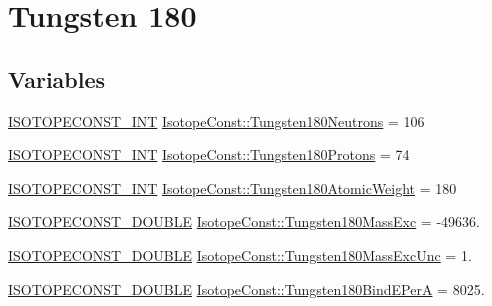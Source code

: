 \hypertarget{group___isotope_const-_tungsten-_w180}{}\section{Tungsten 180}
\label{group___isotope_const-_tungsten-_w180}
\subsection*{Variables}
\begin{DoxyCompactItemize}
\item 
\mbox{\hyperlink{group___isotope_const-_macros_ga5f18360b3e99483a35c32d789e62621c}{I\+S\+O\+T\+O\+P\+E\+C\+O\+N\+S\+T\+\_\+\+I\+NT}} \mbox{\hyperlink{group___isotope_const-_tungsten-_w180_ga4a32c21c126fea2022324bc6f21482a7}{Isotope\+Const\+::\+Tungsten180\+Neutrons}} = 106
\item 
\mbox{\hyperlink{group___isotope_const-_macros_ga5f18360b3e99483a35c32d789e62621c}{I\+S\+O\+T\+O\+P\+E\+C\+O\+N\+S\+T\+\_\+\+I\+NT}} \mbox{\hyperlink{group___isotope_const-_tungsten-_w180_ga6e3369c52bd022909dfe80912c58bb9b}{Isotope\+Const\+::\+Tungsten180\+Protons}} = 74
\item 
\mbox{\hyperlink{group___isotope_const-_macros_ga5f18360b3e99483a35c32d789e62621c}{I\+S\+O\+T\+O\+P\+E\+C\+O\+N\+S\+T\+\_\+\+I\+NT}} \mbox{\hyperlink{group___isotope_const-_tungsten-_w180_ga892d97f85df4be45d1b7ab0ab028d2d5}{Isotope\+Const\+::\+Tungsten180\+Atomic\+Weight}} = 180
\item 
\mbox{\hyperlink{group___isotope_const-_macros_ga8f45a7272ce02c0b4c65c44636ed719a}{I\+S\+O\+T\+O\+P\+E\+C\+O\+N\+S\+T\+\_\+\+D\+O\+U\+B\+LE}} \mbox{\hyperlink{group___isotope_const-_tungsten-_w180_ga1ffe7adea8860fd70c7cd7e3ef1ffeab}{Isotope\+Const\+::\+Tungsten180\+Mass\+Exc}} = -\/49636.
\item 
\mbox{\hyperlink{group___isotope_const-_macros_ga8f45a7272ce02c0b4c65c44636ed719a}{I\+S\+O\+T\+O\+P\+E\+C\+O\+N\+S\+T\+\_\+\+D\+O\+U\+B\+LE}} \mbox{\hyperlink{group___isotope_const-_tungsten-_w180_ga34a37ff428425821169402039baacafa}{Isotope\+Const\+::\+Tungsten180\+Mass\+Exc\+Unc}} = 1.
\item 
\mbox{\hyperlink{group___isotope_const-_macros_ga8f45a7272ce02c0b4c65c44636ed719a}{I\+S\+O\+T\+O\+P\+E\+C\+O\+N\+S\+T\+\_\+\+D\+O\+U\+B\+LE}} \mbox{\hyperlink{group___isotope_const-_tungsten-_w180_ga82c99e323853b59b0308c2f335fe6347}{Isotope\+Const\+::\+Tungsten180\+Bind\+E\+PerA}} = 8025.
\item 

\end{DoxyCompactItemize}
